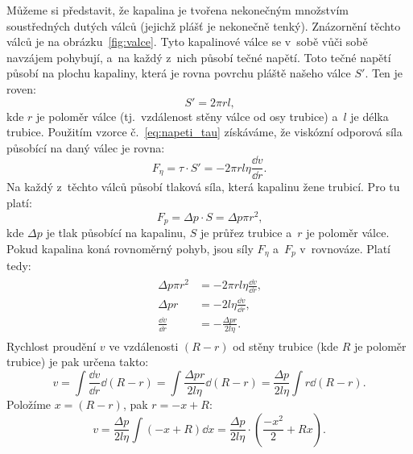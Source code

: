 \documentclass[12pt]{article}
\begin{document}
Můžeme si představit, že kapalina je tvořena nekonečným množstvím soustředných dutých válců (jejichž plášť je nekonečně tenký). Znázornění těchto válců je na obrázku~\ref{fig:valce}. Tyto kapalinové válce se v~sobě vůči sobě navzájem pohybují, a~na každý z~nich působí tečné napětí. Toto tečné napětí působí na plochu kapaliny, která je rovna povrchu pláště našeho válce $S'$. Ten je roven:~\cite{book:Calibration_of_viscometers}
\begin{equation}
    S' = 2\pi rl\text{,}
\end{equation}
kde $r$ je poloměr válce (tj.~vzdálenost stěny válce od osy trubice) a~$l$ je délka trubice. Použitím vzorce č.~\ref{eq:napeti_tau} získáváme, že viskózní odporová síla působící na daný válec je rovna:~\cite{book:Calibration_of_viscometers}
\begin{equation}
    F_\eta = \tau\cdot S' = -2\pi rl\eta\frac{\dd v}{\dd r}\text{.}
\end{equation}
Na každý z~těchto válců působí tlaková síla, která kapalinu žene trubicí. Pro tu platí:~\cite{book:Calibration_of_viscometers}
\begin{equation}
    F_p = \Delta p\cdot S = \Delta p\pi r^2\text{,}
\end{equation}
kde $\Delta p$ je tlak působící na kapalinu, $S$ je průřez trubice a~$r$ je poloměr válce. Pokud kapalina koná rovnoměrný pohyb, jsou síly $F_\eta$ a~$F_p$ v~rovnováze. Platí tedy:~\cite{book:Calibration_of_viscometers}
\begin{align}
    \begin{split}
        \Delta p\pi r^2 &= -2\pi rl\eta\frac{\dd v}{\dd r}\text{,}\\
        \Delta pr &= -2l\eta\frac{\dd v}{\dd r}\text{,}\\
        \frac{\dd v}{\dd r} &= -\frac{\Delta pr}{2l\eta}\text{.}
    \end{split}
\end{align}
Rychlost proudění $v$ ve vzdálenosti $(R-r)$ od stěny trubice (kde $R$ je poloměr trubice) je pak určena takto:~\cite{book:Calibration_of_viscometers}
\begin{equation}
    v = \int \frac{\dd v}{\dd r} \dd (R-r) = \int \frac{\Delta pr}{2l\eta} \dd (R-r) = \frac{\Delta p}{2l\eta}\int r\dd (R-r)\text{.}
\end{equation}
Položíme $x = (R-r)$, pak $r = -x+R$:
\begin{equation}
    v = \frac{\Delta p}{2l\eta}\int(-x+R) \dd x = \frac{\Delta p}{2l\eta}\cdot(\frac{-x^2}{2}+Rx)\text{.}
\end{equation}
\end{document}

